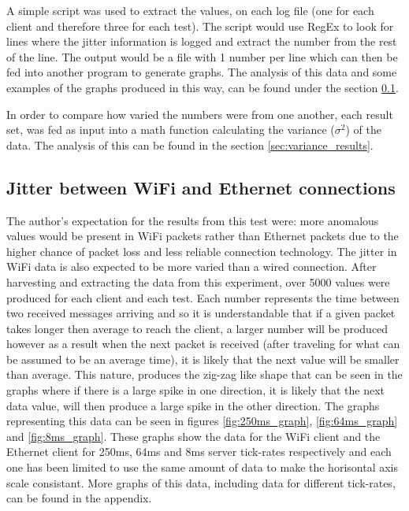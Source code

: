 A simple script was used to extract the values, on each log file (one for each client and therefore three for each test). The script would use RegEx to look for lines where the jitter information is logged and extract the number from the rest of the line. The output would be a file with 1 number per line which can then be fed into another program to generate graphs. The analysis of this data and some examples of the graphs produced in this way, can be found under the section \ref{sec:jitter_results}.

In order to compare how varied the numbers were from one another, each result set, was fed as input into a math function calculating the variance ($\sigma^2$) of the data. The analysis of this can be found in the section \ref{sec:variance_results}.

\newpage
\subsection{Jitter between WiFi and Ethernet connections} \label{sec:jitter_results}
The author's expectation for the results from this test were: more anomalous values would be present in WiFi packets rather than Ethernet packets due to the higher chance of packet loss and less reliable connection technology. The jitter in WiFi data is also expected to be more varied than a wired connection.
After harvesting and extracting the data from this experiment, over 5000 values were produced for each client and each test. Each number represents the time between two received messages arriving and so it is understandable that if a given packet takes longer then average to reach the client, a larger number will be produced however as a result when the next packet is received (after traveling for what can be assumed to be an average time), it is likely that the next value will be smaller than average. This nature, produces the zig-zag like shape that can be seen in the graphs where if there is a large spike in one direction, it is likely that the next data value, will then produce a large spike in the other direction. The graphs representing this data can be seen in figures \ref{fig:250ms_graph}, \ref{fig:64ms_graph} and \ref{fig:8ms_graph}. These graphs show the data for the WiFi client and the Ethernet client for 250ms, 64ms and 8ms server tick-rates respectively and each one has been limited to use the same amount of data to make the horisontal axis scale consistant. More graphs of this data, including data for different tick-rates, can be found in the appendix.

